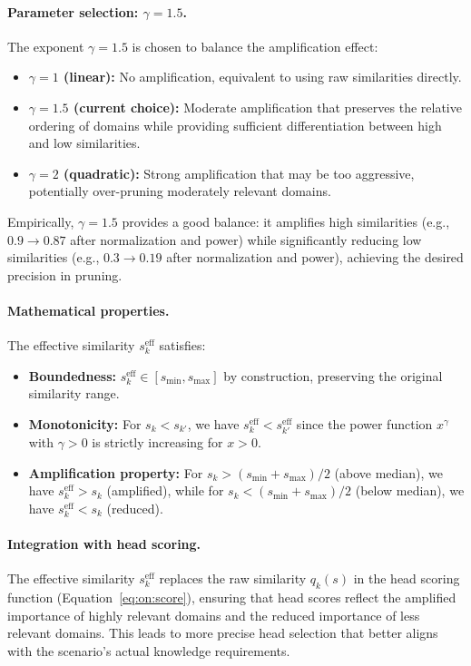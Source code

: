 \paragraph{Parameter selection: $\gamma = 1.5$.}
The exponent $\gamma = 1.5$ is chosen to balance the amplification effect:
\begin{itemize}
    \item \textbf{$\gamma = 1$ (linear):} No amplification, equivalent to using raw similarities directly.
    \item \textbf{$\gamma = 1.5$ (current choice):} Moderate amplification that preserves the relative ordering of domains while providing sufficient differentiation between high and low similarities.
    \item \textbf{$\gamma = 2$ (quadratic):} Strong amplification that may be too aggressive, potentially over-pruning moderately relevant domains.
\end{itemize}
Empirically, $\gamma = 1.5$ provides a good balance: it amplifies high similarities (e.g., $0.9 \rightarrow 0.87$ after normalization and power) while significantly reducing low similarities (e.g., $0.3 \rightarrow 0.19$ after normalization and power), achieving the desired precision in pruning.

\paragraph{Mathematical properties.}
The effective similarity $s_k^{\text{eff}}$ satisfies:
\begin{itemize}
    \item \textbf{Boundedness:} $s_k^{\text{eff}} \in [s_{\min}, s_{\max}]$ by construction, preserving the original similarity range.
    \item \textbf{Monotonicity:} For $s_k < s_{k'}$, we have $s_k^{\text{eff}} < s_{k'}^{\text{eff}}$ since the power function $x^\gamma$ with $\gamma > 0$ is strictly increasing for $x > 0$.
    \item \textbf{Amplification property:} For $s_k > (s_{\min} + s_{\max})/2$ (above median), we have $s_k^{\text{eff}} > s_k$ (amplified), while for $s_k < (s_{\min} + s_{\max})/2$ (below median), we have $s_k^{\text{eff}} < s_k$ (reduced).
\end{itemize}

\paragraph{Integration with head scoring.}
The effective similarity $s_k^{\text{eff}}$ replaces the raw similarity $q_k(s)$ in the head scoring function (Equation~\eqref{eq:on:score}), ensuring that head scores reflect the amplified importance of highly relevant domains and the reduced importance of less relevant domains.
This leads to more precise head selection that better aligns with the scenario's actual knowledge requirements.


